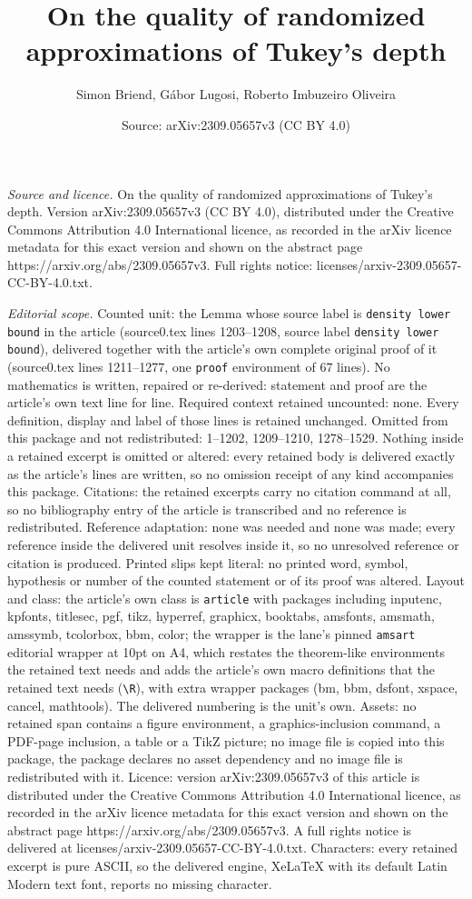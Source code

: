 \documentclass[10pt,a4paper]{amsart}
\title[On the quality of randomized approximations of Tukey's depth]{On the quality of randomized approximations of Tukey's depth}
\author{Simon Briend, G\'abor Lugosi, Roberto Imbuzeiro Oliveira}
\date{Source: arXiv:2309.05657v3 (CC BY 4.0)}
\begin{document}
\maketitle

\noindent\emph{Source and licence.} On the quality of randomized approximations of Tukey's depth. Version arXiv:2309.05657v3 (CC BY 4.0), distributed under the Creative Commons Attribution 4.0 International licence, as recorded in the arXiv licence metadata for this exact version and shown on the abstract page https://arxiv.org/abs/2309.05657v3. Full rights notice: licenses/arxiv-2309.05657-CC-BY-4.0.txt.\par\smallskip

\noindent\textit{Editorial scope.} Counted unit: the Lemma whose source label is \texttt{density lower bound} in the article (source0.tex lines 1203--1208, source label \texttt{density lower bound}), delivered together with the article's own complete original proof of it (source0.tex lines 1211--1277, one \texttt{proof} environment of 67 lines). No mathematics is written, repaired or re-derived: statement and proof are the article's own text line for line. Required context retained uncounted: none. Every definition, display and label of those lines is retained unchanged. Omitted from this package and not redistributed: 1--1202, 1209--1210, 1278--1529. Nothing inside a retained excerpt is omitted or altered: every retained body is delivered exactly as the article's lines are written, so no omission receipt of any kind accompanies this package. Citations: the retained excerpts carry no citation command at all, so no bibliography entry of the article is transcribed and no reference is redistributed. Reference adaptation: none was needed and none was made; every reference inside the delivered unit resolves inside it, so no unresolved reference or citation is produced. Printed slips kept literal: no printed word, symbol, hypothesis or number of the counted statement or of its proof was altered. Layout and class: the article's own class is \texttt{article} with packages including inputenc, kpfonts, titlesec, pgf, tikz, hyperref, graphicx, booktabs, amsfonts, amsmath, amssymb, tcolorbox, bbm, color; the wrapper is the lane's pinned \texttt{amsart} editorial wrapper at 10pt on A4, which restates the theorem-like environments the retained text needs and adds the article's own macro definitions that the retained text needs (\texttt{\textbackslash R}), with extra wrapper packages (bm, bbm, dsfont, xspace, cancel, mathtools). The delivered numbering is the unit's own. Assets: no retained span contains a figure environment, a graphics-inclusion command, a PDF-page inclusion, a table or a TikZ picture; no image file is copied into this package, the package declares no asset dependency and no image file is redistributed with it. Licence: version arXiv:2309.05657v3 of this article is distributed under the Creative Commons Attribution 4.0 International licence, as recorded in the arXiv licence metadata for this exact version and shown on the abstract page https://arxiv.org/abs/2309.05657v3. A full rights notice is delivered at licenses/arxiv-2309.05657-CC-BY-4.0.txt. Characters: every retained excerpt is pure ASCII, so the delivered engine, XeLaTeX with its default Latin Modern text font, reports no missing character.
\end{document}
